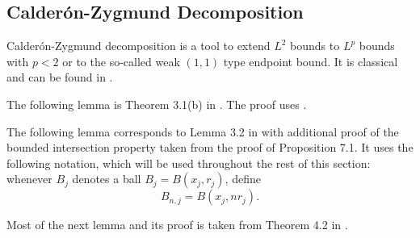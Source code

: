 







\subsection{Calder\'on-Zygmund Decomposition}
\label{subsec-CZD}
Calder\'on-Zygmund decomposition is a tool to extend $L^2$ bounds to $L^p$ bounds with $p<2$ or to the so-called weak $(1, 1)$ type endpoint bound.
It is classical and can be found in \cite{stein-book}.

The following lemma is Theorem 3.1(b) in \cite{stein-book}. The proof uses .






The following lemma corresponds to Lemma 3.2 in \cite{stein-book} with additional proof of the bounded intersection property taken from the proof of Proposition 7.1.
It uses the following notation, which will be used throughout the rest of this section: whenever $B_j$ denotes a ball $B_j = B(x_j, r_j)$, define
\begin{equation*}
    B_{n,j} = B(x_j, nr_j).
\end{equation*}


Most of the next lemma and its proof is taken from Theorem 4.2 in \cite{stein-book}.



